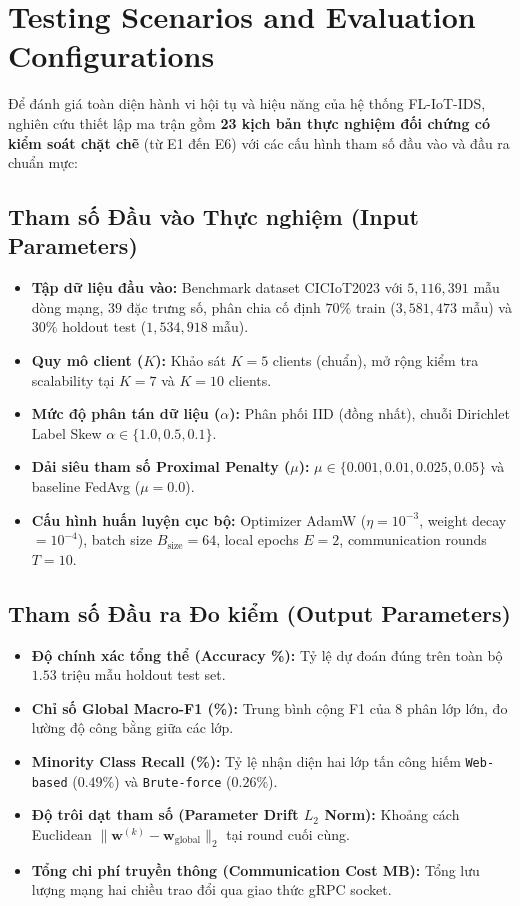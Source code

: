 \section{Testing Scenarios and Evaluation Configurations}
\label{sec:res_scenarios_configs}
Để đánh giá toàn diện hành vi hội tụ và hiệu năng của hệ thống FL-IoT-IDS, nghiên cứu thiết lập ma trận gồm \textbf{23 kịch bản thực nghiệm đối chứng có kiểm soát chặt chẽ} (từ E1 đến E6) với các cấu hình tham số đầu vào và đầu ra chuẩn mực:

\subsection{Tham số Đầu vào Thực nghiệm (Input Parameters)}
\begin{itemize}
    \item \textbf{Tập dữ liệu đầu vào:} Benchmark dataset CICIoT2023 với $5,116,391$ mẫu dòng mạng, $39$ đặc trưng số, phân chia cố định $70\%$ train ($3,581,473$ mẫu) và $30\%$ holdout test ($1,534,918$ mẫu).
    \item \textbf{Quy mô client ($K$):} Khảo sát $K = 5$ clients (chuẩn), mở rộng kiểm tra scalability tại $K = 7$ và $K = 10$ clients.
    \item \textbf{Mức độ phân tán dữ liệu ($\alpha$):} Phân phối IID (đồng nhất), chuỗi Dirichlet Label Skew $\alpha \in \{1.0, 0.5, 0.1\}$.
    \item \textbf{Dải siêu tham số Proximal Penalty ($\mu$):} $\mu \in \{0.001, 0.01, 0.025, 0.05\}$ và baseline FedAvg ($\mu = 0.0$).
    \item \textbf{Cấu hình huấn luyện cục bộ:} Optimizer AdamW ($\eta = 10^{-3}$, weight decay $= 10^{-4}$), batch size $B_{\text{size}} = 64$, local epochs $E = 2$, communication rounds $T = 10$.
\end{itemize}

\subsection{Tham số Đầu ra Đo kiểm (Output Parameters)}
\begin{itemize}
    \item \textbf{Độ chính xác tổng thể (Accuracy \%):} Tỷ lệ dự đoán đúng trên toàn bộ $1.53$ triệu mẫu holdout test set.
    \item \textbf{Chỉ số Global Macro-F1 (\%):} Trung bình cộng F1 của 8 phân lớp lớn, đo lường độ công bằng giữa các lớp.
    \item \textbf{Minority Class Recall (\%):} Tỷ lệ nhận diện hai lớp tấn công hiếm \texttt{Web-based} ($0.49\%$) và \texttt{Brute-force} ($0.26\%$).
    \item \textbf{Độ trôi dạt tham số (Parameter Drift $L_2$ Norm):} Khoảng cách Euclidean $\|\mathbf{w}^{(k)} - \mathbf{w}_{\text{global}}\|_2$ tại round cuối cùng.
    \item \textbf{Tổng chi phí truyền thông (Communication Cost MB):} Tổng lưu lượng mạng hai chiều trao đổi qua giao thức gRPC socket.
\end{itemize}

